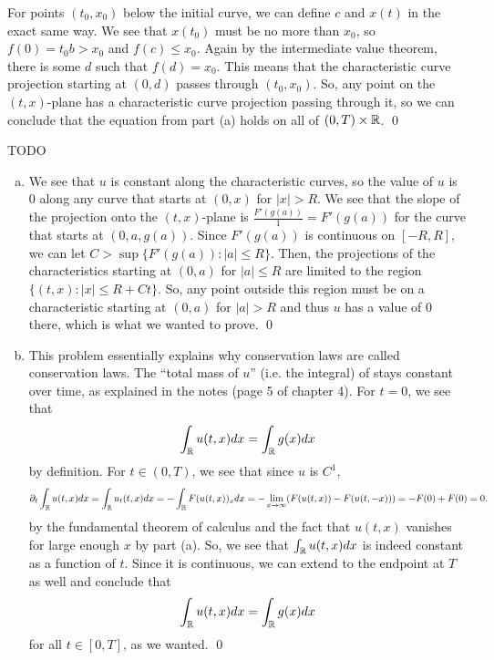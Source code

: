 \documentclass{article}
\renewcommand{\d}{\partial}
\begin{document}
\begin{enumerate}
    \hop 
    For points $(t_0, x_0)$ below the initial curve, we can define $c$ and $x(t)$ in the exact same way. We see that $x(t_0)$ must be no more than $x_0$, so $f(0) = t_0b > x_0$ and $f(c) \le x_0$. Again by the intermediate value theorem, there is some $d$ such that $f(d) = x_0$. This means that the characteristic curve projection starting at $(0,d)$ passes through $(t_0,x_0)$. 
    \hop 
    So, any point on the $(t,x)$-plane has a characteristic curve projection passing through it, so we can conclude that the equation from part (a) holds on all of $(0,T) \times \mathbb{R}$. \qed
\end{enumerate}


\newpage
{} TODO
\hop
\solution
\begin{enumerate}[(a)]
    \item We see that $u$ is constant along the characteristic curves, so the value of $u$ is $0$ along any curve that starts at $(0,x)$ for $|x| > R$. We see that the slope of the projection onto the $(t,x)$-plane is $\frac{F'(g(a))}{1} = F'(g(a))$ for the curve that starts at $(0, a, g(a))$. Since $F'(g(a))$ is continuous on $[-R, R]$, we can let $C > \sup \{F'(g(a)) : |a| \le R \}$. Then, the projections of the characteristics starting at $(0,a)$ for $|a| \le R$ are limited to the region $\{(t,x): |x| \le R+Ct\}$. So, any point outside this region must be on a characteristic starting at  $(0,a)$ for $|a| > R$ and thus $u$ has a value of 0 there, which is what we wanted to prove. \qed 
    \item This problem essentially explains why conservation laws are called conservation laws. The ``total mass of $u$'' (i.e. the integral) of stays constant over time, as explained in the notes (page 5 of chapter 4).
    \hop 
    For $t = 0$, we see that 
    \[\int_{\mathbb{R}} u(t,x)dx = \int_{\mathbb{R}} g(x) dx\]
    by definition. For $t \in (0,T)$, we see that since $u$ is $C^1$, 
    \[\d_t\int_\RR u(t,x)dx = \int_\RR u_t(t,x)dx = -\int_\RR F(u(t,x))_x dx  =  -\lim_{x \to \infty}( F(u(t,x)) - F(u(t,-x)))= -F(0) +F(0) =0.\]
    by the fundamental theorem of calculus and the fact that $u(t,x)$ vanishes for large enough $x$ by part (a). 
    \hop
    So, we see that $\int_{\mathbb{R}} u(t,x)dx$ is indeed constant as a function of $t$. Since it is continuous, we can extend to the endpoint at $T$ as well and conclude that 
    \[\int_{\mathbb{R}} u(t,x)dx = \int_{\mathbb{R}} g(x) dx\]
    for all $t \in [0,T]$, as we wanted. \qed
\end{enumerate}
\end{document}

